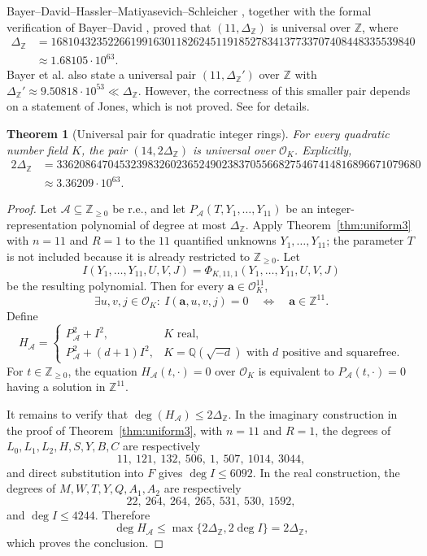\documentclass[12pt]{amsart}
\numberwithin{equation}{section}
\newtheorem{theorem}{Theorem}[section]
\theoremstyle{remark}
\theoremstyle{plain}
\newcommand{\Z}{\mathbb{Z}}
\newcommand{\Q}{\mathbb{Q}}
\newcommand{\sO}{\mathcal{O}}
\newcommand{\sA}{\mathcal{A}}
\newcommand{\ba}{\mathbf{a}}
\begin{document}
Bayer--David--Hassler--Matiyasevich--Schleicher \cite{BayerEtAl25}, together with the formal verification of Bayer--David \cite{BayerDavid25}, proved that $(11,\Delta_{\Z})$ is universal over $\Z$, where
\[
\begin{aligned}
	\Delta_{\Z}&=1681043235226619916301182624511918527834137733707408448335539840\\
	&\approx1.68105\cdot10^{63}.
\end{aligned}
\]
Bayer et al. \cite{BayerEtAl25} also state a universal pair $(11,\Delta_{\Z}')$ over $\Z$ with $\Delta_{\Z}'\approx9.50818\cdot10^{53}\ll\Delta_{\Z}$. However, the correctness of this smaller pair depends on a statement of Jones, which is not proved. See \cite[\S~0.3]{BayerEtAl25} for details.

\begin{theorem}[Universal pair for quadratic integer rings]\label{thm:universalpairOK}
For every quadratic number field $K$, the pair $(14,2\Delta_{\Z})$ is universal over $\sO_K$. Explicitly,
\[
\begin{aligned}
	2\Delta_{\Z}&=3362086470453239832602365249023837055668275467414816896671079680\\
	&\approx3.36209\cdot10^{63}.
\end{aligned}
\]
\end{theorem}
\begin{proof}
Let $\sA\subseteq\Z_{\geq0}$ be r.e., and let
$P_{\sA}(T,Y_1,\ldots,Y_{11})$ be an integer-representation polynomial of degree at most $\Delta_{\Z}$. Apply Theorem~\ref{thm:uniform3} with $n=11$ and $R=1$ to the $11$ quantified unknowns $Y_1,\ldots,Y_{11}$; the parameter $T$ is not included because it is already restricted to $\Z_{\geq0}$. Let
\[
I(Y_1,\ldots,Y_{11},U,V,J)=\Phi_{K,11,1}(Y_1,\ldots,Y_{11},U,V,J)
\]
be the resulting polynomial. Then for every $\ba\in\sO_K^{11}$,
\[
\exists u,v,j\in\sO_K\colon\ I(\ba,u,v,j)=0\quad\Longleftrightarrow\quad\ba\in\Z^{11}.
\]
Define
\[
H_{\sA}=
\begin{cases}
P_{\sA}^2+I^2, & K\text{ real},\\[2mm]
P_{\sA}^2+(d+1)I^2, & K=\Q(\sqrt{-d})\text{ with }d\text{ positive and squarefree}.
\end{cases}
\]
For $t\in\Z_{\geq0}$, the equation $H_{\sA}(t,\cdot)=0$ over $\sO_K$ is equivalent to $P_{\sA}(t,\cdot)=0$ having a solution in $\Z^{11}$. 

It remains to verify that $\deg(H_{\sA})\leq 2\Delta_\Z$. In the imaginary construction in the proof of Theorem~\ref{thm:uniform3}, with $n=11$ and $R=1$, the degrees of $L_0,L_1,L_2,H,S,Y,B,C$ are respectively
\[
11,\ 121,\ 132,\ 506,\ 1,\ 507,\ 1014,\ 3044,
\]
and direct substitution into $F$ gives $\deg I\leq6092$. In the real construction, the degrees of $M,W,T,Y,Q,A_1,A_2$ are respectively
\[
22,\ 264,\ 264,\ 265,\ 531,\ 530,\ 1592,
\]
and $\deg I\leq4244$. Therefore
\[
\deg H_{\sA}\leq\max\{2\Delta_{\Z},2\deg I\}=2\Delta_{\Z},
\]
which proves the conclusion.
\end{proof}
\end{document}
